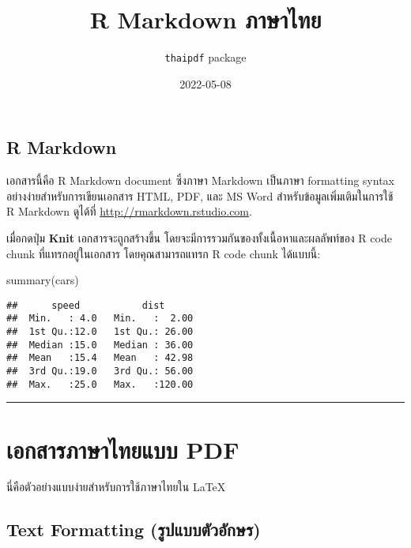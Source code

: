 \documentclass[
]{article}
\title{R Markdown ภาษาไทย}
\author{\texttt{thaipdf} package}
\date{2022-05-08}
\newenvironment{Shaded}{\begin{snugshade}}{\end{snugshade}}
\newcommand{\FunctionTok}[1]{\textcolor[rgb]{0.00,0.00,0.00}{#1}}
\newcommand{\NormalTok}[1]{#1}
\begin{document}
\maketitle

\sloppy %

\hypertarget{r-markdown}{%
\subsection{R Markdown}\label{r-markdown}}

เอกสารนี้คือ R Markdown document ซึ่งภาษา Markdown เป็นภาษา formatting
syntax อย่างง่ายสำหรับการเขียนเอกสาร HTML, PDF, และ MS Word
สำหรับข้อมูลเพิ่มเติมในการใช้ R Markdown ดูได้ที่
\url{http://rmarkdown.rstudio.com}.

เมื่อกดปุ่ม \textbf{Knit} เอกสารจะถูกสร้างขึ้น
โดยจะมีการรวมกันของทั้งเนื้อหาและผลลัพท์ของ R code chunk
ที่แทรกอยู่ในเอกสาร โดยคุณสามารถแทรก R code chunk ได้แบบนี้:

\begin{Shaded}
\begin{Highlighting}[]
\FunctionTok{summary}\NormalTok{(cars)}
\end{Highlighting}
\end{Shaded}

\begin{verbatim}
##      speed           dist       
##  Min.   : 4.0   Min.   :  2.00  
##  1st Qu.:12.0   1st Qu.: 26.00  
##  Median :15.0   Median : 36.00  
##  Mean   :15.4   Mean   : 42.98  
##  3rd Qu.:19.0   3rd Qu.: 56.00  
##  Max.   :25.0   Max.   :120.00
\end{verbatim}

\begin{center}\rule{0.5\linewidth}{0.5pt}\end{center}

\hypertarget{uxe40uxe2duxe01uxe2auxe32uxe23uxe20uxe32uxe29uxe32uxe44uxe17uxe22uxe41uxe1auxe1a-pdf}{%
\section{เอกสารภาษาไทยแบบ
PDF}\label{uxe40uxe2duxe01uxe2auxe32uxe23uxe20uxe32uxe29uxe32uxe44uxe17uxe22uxe41uxe1auxe1a-pdf}}

นี่คือตัวอย่างแบบง่ายสำหรับการใช้ภาษาไทยใน \LaTeX

\hypertarget{text-formatting-uxe23uxe1buxe41uxe1auxe1auxe15uxe27uxe2duxe01uxe29uxe23}{%
\subsection{Text Formatting
(รูปแบบตัวอักษร)}\label{text-formatting-uxe23uxe1buxe41uxe1auxe1auxe15uxe27uxe2duxe01uxe29uxe23}}
\end{document}
